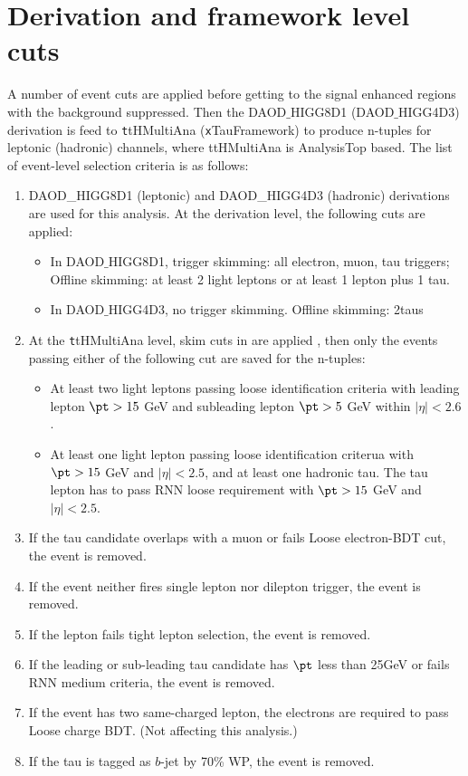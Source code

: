 \section{Derivation and framework level cuts}
\label{app:cuts}
A number of event cuts are applied before getting to the signal enhanced regions with the background suppressed. Then the DAOD$\_$HIGG8D1 (DAOD$\_$HIGG4D3) derivation is feed to {\texttt ttHMultiAna} ({\texttt xTauFramework}) to produce n-tuples for leptonic (hadronic) channels, where ttHMultiAna is AnalysisTop \cite{AnalysisTop} based. The list of event-level selection criteria is as follows:

\begin{enumerate}
\item DAOD\_HIGG8D1 (leptonic) and DAOD\_HIGG4D3 (hadronic) derivations are used for this analysis. At the derivation level, the following cuts are applied:
  \begin{itemize}
  \item In DAOD$\_$HIGG8D1, trigger skimming: all electron, muon, tau triggers; Offline skimming: at least 2 light leptons or at least 1 lepton plus 1 tau.
  \item In DAOD$\_$HIGG4D3, no trigger skimming. Offline skimming: 2taus
  \end{itemize}
\item At the {\texttt ttHMultiAna} level, skim cuts in \cite{ATL-COM-PHYS-2018-410} are applied , then only the events passing either of the following cut are saved for the n-tuples:
  \begin{itemize}
  \item At least two light leptons passing loose identification criteria with leading lepton $\pt > 15$ GeV and subleading lepton $\pt > 5$ GeV within $|\eta|<2.6$.
  \item At least one light lepton passing loose identification criterua with $\pt >15$ GeV and $|\eta|<2.5$, and at least one hadronic tau. The tau lepton has to pass RNN loose requirement with $\pt >15$ GeV and $|\eta|<2.5$.
  \end{itemize}
\item If the tau candidate overlaps with a muon or fails Loose electron-BDT cut, the event is removed.
\item If the event neither fires single lepton nor dilepton trigger, the event is removed.
\item If the lepton fails tight lepton selection, the event is removed.
\item If the leading or sub-leading tau candidate has $\pt$ less than 25GeV or fails RNN medium criteria, the event is removed.
\item If the event has two same-charged lepton, the electrons are required to pass Loose charge BDT. (Not affecting this analysis.)
\item If the tau is tagged as $b$-jet by 70\% WP, the event is removed.




\end{enumerate}
